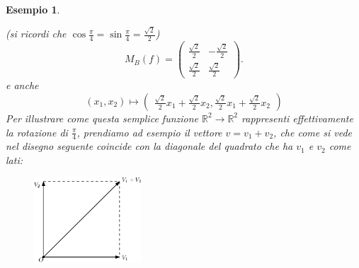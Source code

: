 \message{ !name(algebraegeometria.tex)}\documentclass{book}
\newtheorem{esempio}{Esempio}
\begin{document}
\begin{esempio}
\begin{enumerate}
    (si ricordi che $\cos\frac{\pi}{4}=\sin\frac{\pi}{4}=\frac{\sqrt{2}}{2}$)
    \begin{equation*}
      M_B(f)=
      \begin{pmatrix}
        \frac{\sqrt{2}}{2} & -\frac{\sqrt{2}}{2} \\
        \frac{\sqrt{2}}{2} & \frac{\sqrt{2}}{2}
      \end{pmatrix}.
    \end{equation*}
    e anche
    \begin{equation}
      (x_1,x_2)\mapsto
      \begin{pmatrix}
        \frac{\sqrt{2}}{2}x_1+\frac{\sqrt{2}}{2}x_2,\frac{\sqrt{2}}{2}x_1+\frac{\sqrt{2}}{2}x_2
      \end{pmatrix}
    \end{equation}
    Per illustrare come questa semplice funzione $\mathds{R}^2\to\mathds{R}^2$ rappresenti effettivamente la
    rotazione di $\frac{\pi}{4}$, prendiamo ad esempio il vettore $v=v_1+v_2$, che come si vede nel disegno
    seguente coincide con la diagonale del quadrato che ha $v_1$ e $v_2$ come lati:
    \begin{figure}[th]
      \centering
        \includegraphics[width=4cm]{img/finiti/imgex4-3-4.eps}
    \end{figure}


\end{enumerate}
\end{esempio}
\end{document}

